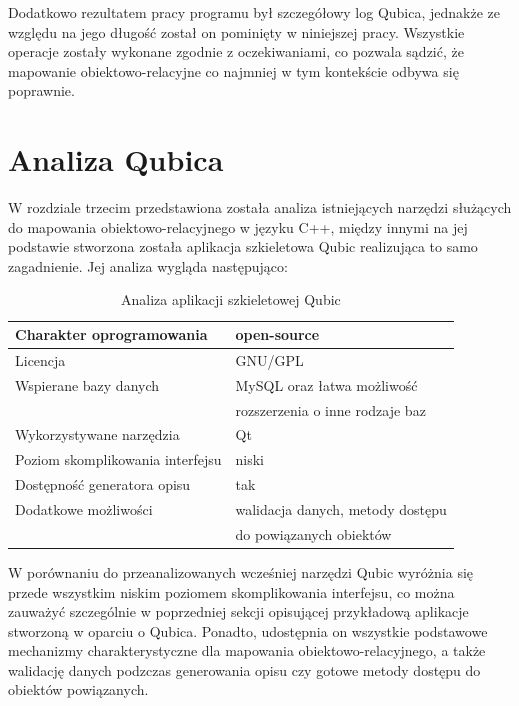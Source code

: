 \documentclass[12pt]{report}
\begin{document}


Dodatkowo rezultatem pracy programu był szczegółowy log Qubica, jednakże ze względu na jego długość został on pominięty w niniejszej pracy. Wszystkie operacje zostały
wykonane zgodnie z oczekiwaniami, co pozwala sądzić, że mapowanie obiektowo-relacyjne co najmniej w tym kontekście odbywa się poprawnie.

\section{Analiza Qubica}

W rozdziale trzecim przedstawiona została analiza istniejących narzędzi służących do mapowania obiektowo-relacyjnego w języku C++, między innymi na jej podstawie
stworzona została aplikacja szkieletowa Qubic realizująca to samo zagadnienie. Jej analiza wygląda następująco:

\newpage

\begin{table}[h]
\centering
\begin{tabular}{| l | l |} 
\hline 
Charakter oprogramowania & open-source \\ \hline
Licencja & GNU/GPL  \\ \hline
Wspierane bazy danych & MySQL oraz łatwa możliwość \\ \hline
&  rozszerzenia o inne rodzaje baz \\ \hline
Wykorzystywane narzędzia & Qt  \\ \hline
Poziom skomplikowania interfejsu & niski  \\ \hline
Dostępność generatora opisu & tak  \\ \hline
Dodatkowe możliwości &  walidacja danych, metody dostępu  \\ \hline
& do powiązanych obiektów \\ \hline
\end{tabular} 
\caption{Analiza aplikacji szkieletowej Qubic}
\end{table}

W porównaniu do przeanalizowanych wcześniej narzędzi Qubic wyróżnia się przede wszystkim niskim poziomem skomplikowania interfejsu, co można zauważyć szczególnie w
poprzedniej sekcji opisującej przykładową aplikacje stworzoną w oparciu o Qubica. Ponadto, udostępnia on wszystkie podstawowe mechanizmy charakterystyczne dla mapowania
obiektowo-relacyjnego, a także walidację danych podzczas generowania opisu czy gotowe metody dostępu do obiektów powiązanych. 
\end{document}
